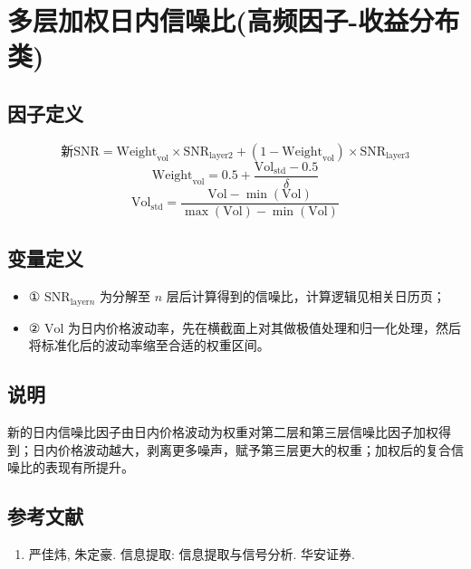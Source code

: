 \documentclass{article}
\begin{document}
\section{多层加权日内信噪比(高频因子-收益分布类)}

\subsection{因子定义}
\begin{equation}
    \text{新}\mathrm{SNR} = \mathrm{Weight}_{\mathrm{vol}} \times \mathrm{SNR}_{\mathrm{layer2}} + (1 - \mathrm{Weight}_{\mathrm{vol}}) \times \mathrm{SNR}_{\mathrm{layer3}}
\end{equation}
\begin{equation}
    \mathrm{Weight}_{\mathrm{vol}} = 0.5 + \frac{\mathrm{Vol}_{\mathrm{std}} - 0.5}{\delta}
\end{equation}
\begin{equation}
    \mathrm{Vol}_{\mathrm{std}} = \frac{\mathrm{Vol} - \min(\mathrm{Vol})}{\max(\mathrm{Vol}) - \min(\mathrm{Vol})}
\end{equation}

\subsection{变量定义}
\begin{itemize}
    \item ① \( \mathrm{SNR}_{\mathrm{layer}n} \) 为分解至 \( n \) 层后计算得到的信噪比，计算逻辑见相关日历页；
    \item ② \( \mathrm{Vol} \) 为日内价格波动率，先在横截面上对其做极值处理和归一化处理，然后将标准化后的波动率缩至合适的权重区间。
\end{itemize}

\subsection{说明}
新的日内信噪比因子由日内价格波动为权重对第二层和第三层信噪比因子加权得到；日内价格波动越大，剥离更多噪声，赋予第三层更大的权重；加权后的复合信噪比的表现有所提升。

\subsection{参考文献}
\begin{enumerate}
    \item 严佳炜, 朱定豪. 信息提取: 信息提取与信号分析. 华安证券.
\end{enumerate}
\end{document}
